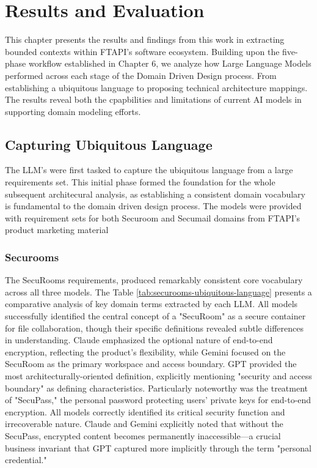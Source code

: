 \chapter{Results and Evaluation}

This chapter presents the results and findings from this work in extracting bounded contexts within FTAPI's software ecosystem. Building upon the five-phase workflow established in Chapter 6, we analyze how Large Language Models performed across each stage of the Domain Driven Design process. From establishing a ubiquitous language to proposing technical architecture mappings. The results reveal both the cpapbilities and limitations of current AI models in supporting domain modeling efforts.

\section{Capturing Ubiquitous Language}
The LLM's were first tasked to capture the ubiquitous language from a large requirements set. This initial phase formed the foundation for the whole subsequent architecural analysis, as establishing a consistent domain vocabulary is fundamental to the domain driven design process. The models were provided with requirement sets for both Securoom and Secumail domains from FTAPI's product marketing material

\subsection{Securooms}
The SecuRooms requirements, produced remarkably consistent core vocabulary across all three models. The Table \ref{tab:securooms-ubiquitous-language} presents a comparative analysis of key domain terms extracted by each LLM. All models successfully identified the central concept of a "SecuRoom" as a secure container for file collaboration, though their specific definitions revealed subtle differences in understanding. Claude emphasized the optional nature of end-to-end encryption, reflecting the product's flexibility, while Gemini focused on the SecuRoom as the primary workspace and access boundary. GPT provided the most architecturally-oriented definition, explicitly mentioning "security and access boundary" as defining characteristics. Particularly noteworthy was the treatment of "SecuPass," the personal password protecting users' private keys for end-to-end encryption. All models correctly identified its critical security function and irrecoverable nature. Claude and Gemini explicitly noted that without the SecuPass, encrypted content becomes permanently inaccessible—a crucial business invariant that GPT captured more implicitly through the term "personal credential."

